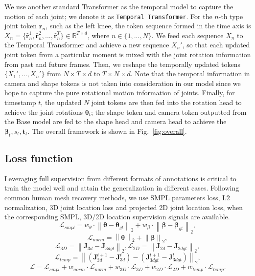 We use another standard Transformer as the temporal model to capture the motion of each joint; we denote it as \verb|Temporal Transformer|. For the $n$-th type joint token $\boldsymbol{r}_n$, such as the left knee, the token sequence formed in the time axis is $X_n=\{\hat{\boldsymbol{r}}_n^1, \hat{\boldsymbol{r}}_n^2, ..., \hat{\boldsymbol{r}}_n^T\} \in \mathbb{R}^{T \times d}$, where $n\in\{1,...,N\}$. We feed each sequence $X_n$ to the Temporal Transformer and achieve a new sequence $X_n'$, so that each updated joint token from a particular moment is mixed with the joint rotation information from past and future frames. 
Then, we  reshape the temporally updated tokens $\{X_1', ..., X_n'\}$ from $N \times T \times d$ to $T \times N \times d$. 
 Note that the temporal information in camera and shape tokens is not taken into consideration in our model since we hope to capture the pure rotational motion information of joints. 
 Finally, for timestamp $t$, the updated $N$ joint tokens are then fed into the rotation head to achieve the joint rotations $\boldsymbol{\theta}_t$; the shape token and camera token outputted from the Base model are fed to the shape head and camera head to achieve the $\boldsymbol{\beta}_t, s_t, \boldsymbol{t}_t$. The overall framework is shown in Fig.~\ref{fig:overall}.


%

\subsection{Loss function}
Leveraging full supervision from different formats of annotations is critical to train the model well and attain the generalization in different cases.
Following common human mesh recovery methods, we use SMPL parameters loss, L2 normalization, 3D joint location loss and projected 2D joint location loss, when the corresponding SMPL, 3D/2D location supervision signals are available.
$$\mathcal{L}_{smpl}=w_{\theta} \cdot \left\|\boldsymbol{\theta}-\boldsymbol{\theta}_{gt}\right\|_2 +   w_{\beta} \cdot \left\|\boldsymbol{\beta}-\boldsymbol{\beta}_{gt}\right\|_2,$$
$$\mathcal{L}_{norm}= \left\| \boldsymbol{\theta}\right\|_2 + \left\| \boldsymbol{\beta}\right\|_2,$$
$$\mathcal{L}_{3D}=\left\| \boldsymbol{J}_{3d} - \boldsymbol{J}_{3dgt}\right\|_2 , \mathcal{L}_{2D}=\left\| \boldsymbol{J}_{2d} - \boldsymbol{J}_{2dgt}\right\|_2, $$
$$\mathcal{L}_{temp}=\left\| (\boldsymbol{J}_{3d}^{t+1}- \boldsymbol{J}_{3d}^{t}) - (\boldsymbol{J}_{3dgt}^{t+1}- \boldsymbol{J}_{3dgt}^{t}) \right\|_2,$$
$$\mathcal{L}=\mathcal{L}_{smpl} + w_{norm} \cdot \mathcal{L}_{norm} + w_{3D} \cdot \mathcal{L}_{3D} + w_{2D} \cdot \mathcal{L}_{2D} + w_{temp} \cdot \mathcal{L}_{temp}.$$


